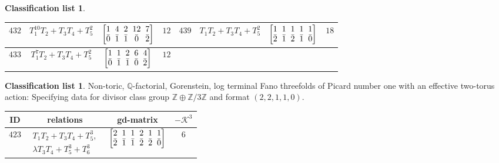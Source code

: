 \documentclass[10pt,a4paper]{amsart}
\theoremstyle{definition}
\newtheorem{class-list}[thm]{Classification list}
\def\ZZ{{\mathbb Z}}
\def\QQ{{\mathbb Q}}
\numberwithin{equation}{section}
\begin{document}
\begin{class-list}
\begin{table}[h!]
\begin{tabu}{c|c|c|c||c|c|c|c}
\\
\hline
${432}$&${T_{1}^{10}T_{2}+T_{3}T_{4}+T_{5}^{2}}$
&$\arraycolsep=1mm\begin{bmatrix}{1} & {4} & {2} & {12} & {7} \\ {\bar{0}} & {\bar{1}} & {\bar{1}} & {\bar{0}} & {\bar{2}}\end{bmatrix}$&${12}$
&${439}$&${T_{1}T_{2}+T_{3}T_{4}+T_{5}^{2}}$
&$\arraycolsep=1mm\begin{bmatrix}{1} & {1} & {1} & {1} & {1} \\ {\bar{2}} & {\bar{1}} & {\bar{2}} & {\bar{1}} & {\bar{0}}\end{bmatrix}$&${18}$
\\
\hline
${433}$&${T_{1}^{7}T_{2}+T_{3}T_{4}+T_{5}^{2}}$
&$\arraycolsep=1mm\begin{bmatrix}{1} & {1} & {2} & {6} & {4} \\ {\bar{0}} & {\bar{1}} & {\bar{1}} & {\bar{0}} & {\bar{2}}\end{bmatrix}$&${12}$
\\
\end{tabu}%
\end{table}
\end{class-list}

\begin{class-list}
Non-toric, $\QQ$-factorial, Gorenstein, log terminal Fano
threefolds of Picard number one with an effective two-torus action:
Specifying data for divisor class group $\ZZ\oplus \ZZ/3\ZZ$
and format $(2,2,1,1,0)$.
\begin{table}[h!]\centering\setlength{\tabcolsep}{5.5pt}
\renewcommand{\arraystretch}{1.35}\small\tabulinesep=1mm
\begin{tabu}{c|c|c|c}
\hline
ID&relations&gd-matrix&$-\mathcal{K}^3$
\\
\hline
${423}$&$\begin{array}{r}{T_{1}T_{2}+T_{3}T_{4}+T_{5}^{3}},\\ {\lambda T_{3}T_{4}+T_{5}^{3}+T_{6}^{3}}\end{array}$
&$\arraycolsep=1mm\begin{bmatrix}{2} & {1} & {1} & {2} & {1} & {1} \\ {\bar{2}} & {\bar{1}} & {\bar{1}} & {\bar{2}} & {\bar{2}} & {\bar{0}}\end{bmatrix}$&${6}$
\\
\hline
\end{tabu}\vspace{2mm}
\end{table}
\end{class-list}
\end{document}
